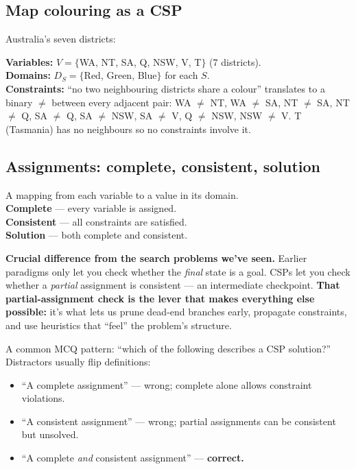 \documentclass[11pt, a4paper]{article}
\begin{document}
\subsection{Map colouring as a CSP}

Australia's seven districts:

\begin{exbox}
\textbf{Variables:} $V = \{$WA, NT, SA, Q, NSW, V, T$\}$ (7 districts).\\
\textbf{Domains:} $D_S = \{$Red, Green, Blue$\}$ for each $S$.\\
\textbf{Constraints:} ``no two neighbouring districts share a colour'' translates to a binary $\neq$ between every adjacent pair: WA $\neq$ NT, WA $\neq$ SA, NT $\neq$ SA, NT $\neq$ Q, SA $\neq$ Q, SA $\neq$ NSW, SA $\neq$ V, Q $\neq$ NSW, NSW $\neq$ V. T (Tasmania) has no neighbours so no constraints involve it.
\end{exbox}

\subsection{Assignments: complete, consistent, solution}

\begin{defbox}[Assignment]
A mapping from each variable to a value in its domain. \\[0.2em]
\textbf{Complete} — every variable is assigned. \\
\textbf{Consistent} — all constraints are satisfied. \\
\textbf{Solution} — both complete and consistent.
\end{defbox}

\textbf{Crucial difference from the search problems we've seen.} Earlier paradigms only let you check whether the \emph{final} state is a goal. CSPs let you check whether a \emph{partial} assignment is consistent — an intermediate checkpoint. \textbf{That partial-assignment check is the lever that makes everything else possible:} it's what lets us prune dead-end branches early, propagate constraints, and use heuristics that ``feel'' the problem's structure.

\begin{trapbox}
A common MCQ pattern: ``which of the following describes a CSP solution?'' Distractors usually flip definitions:
\begin{itemize}[leftmargin=*, itemsep=0pt, topsep=0pt]
  \item ``A complete assignment'' — wrong; complete alone allows constraint violations.
  \item ``A consistent assignment'' — wrong; partial assignments can be consistent but unsolved.
  \item ``A complete \emph{and} consistent assignment'' — \textbf{correct.}
\end{itemize}
\end{trapbox}
\end{document}
